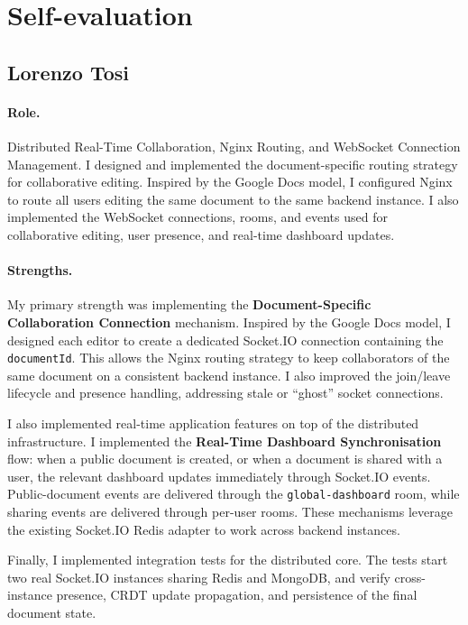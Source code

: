 \documentclass{scrartcl}
\begin{document}
  \section{Self-evaluation}\label{self-evaluation}

  \subsection{Lorenzo Tosi}

  \paragraph{Role.}
  Distributed Real-Time Collaboration, Nginx Routing, and WebSocket Connection Management.
  I designed and implemented the document-specific routing strategy for collaborative
  editing. Inspired by the Google Docs model, I configured Nginx to route all users
  editing the same document to the same backend instance. I also implemented the
  WebSocket connections, rooms, and events used for collaborative editing, user presence,
  and real-time dashboard updates.

  \paragraph{Strengths.}
  My primary strength was implementing the \textbf{Document-Specific Collaboration
  Connection} mechanism. Inspired by the Google Docs model, I designed each editor to
  create a dedicated Socket.IO connection containing the \texttt{documentId}. This allows
  the Nginx routing strategy to keep collaborators of the same document on a consistent
  backend instance. I also improved the join/leave lifecycle and presence handling,
  addressing stale or ``ghost'' socket connections.

  I also implemented real-time application features on top of the distributed
  infrastructure. I implemented the \textbf{Real-Time Dashboard Synchronisation} flow:
  when a public document is created, or when a document is shared with a user, the
  relevant dashboard updates immediately through Socket.IO events. Public-document events
  are delivered through the \texttt{global-dashboard} room, while sharing events are
  delivered through per-user rooms. These mechanisms leverage the existing Socket.IO
  Redis adapter to work across backend instances.

  Finally, I implemented integration tests for the distributed core. The tests start two
  real Socket.IO instances sharing Redis and MongoDB, and verify cross-instance presence,
  CRDT update propagation, and persistence of the final document state.
\end{document}
